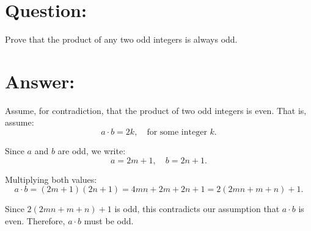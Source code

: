 \documentclass{article}
\begin{document}
\section{Question:}

Prove that the product of any two odd integers is always odd.

\section{Answer:}

Assume, for contradiction, that the product of two odd integers is even. That is, assume:
\begin{equation}
    a \cdot b = 2k, \quad \text{for some integer } k.
\end{equation}

Since $a$ and $b$ are odd, we write:
\begin{equation}
    a = 2m + 1, \quad b = 2n + 1.
\end{equation}

Multiplying both values:
\begin{equation}
    a \cdot b = (2m + 1)(2n + 1) = 4mn + 2m + 2n + 1 = 2(2mn + m + n) + 1.
\end{equation}

Since $2(2mn + m + n) + 1$ is odd, this contradicts our assumption that $a \cdot b$ is even. Therefore, $a \cdot b$ must be odd.
\end{document}
